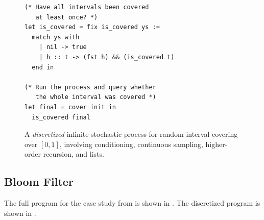 \begin{figure}[t]
\begin{minipage}[t]{0.46\textwidth}
\begin{lstlisting}
(* Have all intervals been covered
   at least once? *)
let is_covered = fix is_covered ys :=
  match ys with
    | nil -> true
    | h :: t -> (fst h) && (is_covered t)
  end in

(* Run the process and query whether
   the whole interval was covered *)
let final = cover init in
  is_covered final
    \end{lstlisting}
    \end{minipage}%
    \hspace{4pt}
    
    \caption{A \emph{discretized} infinite stochastic process for random interval covering over $[0,1]$, involving conditioning, continuous sampling, higher-order recursion, and lists.}
    \label{fig:app:epsball-observe:disc}
\end{figure}


\subsection{Bloom Filter}\label{ap:casestudy:bloom}
The full program for the case study from  is shown in . The discretized program is shown in .

